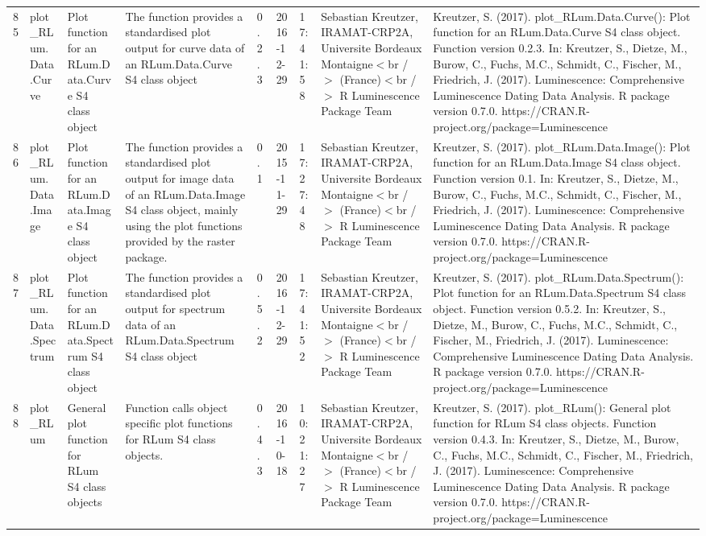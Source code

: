 \begin{table}[ht]
\begin{tabular}{rllllllll}
 \\ 
  85 & plot\_RLum.Data.Curve & Plot function for an RLum.Data.Curve S4 class object & The function provides a standardised plot output for curve data of an RLum.Data.Curve S4 class object & 0.2.3 & 2016-12-29 & 17:41:58
 & Sebastian Kreutzer, IRAMAT-CRP2A, Universite Bordeaux Montaigne$<$br /$>$ (France)$<$br /$>$  R Luminescence Package Team & Kreutzer, S. (2017). plot\_RLum.Data.Curve(): Plot function for an RLum.Data.Curve S4 class object. Function version 0.2.3. In: Kreutzer, S., Dietze, M., Burow, C., Fuchs, M.C., Schmidt, C., Fischer, M., Friedrich, J. (2017). Luminescence: Comprehensive Luminescence Dating Data Analysis. R package version 0.7.0. https://CRAN.R-project.org/package=Luminescence
 \\ 
  86 & plot\_RLum.Data.Image & Plot function for an  RLum.Data.Image  S4 class object & The function provides a standardised plot output for image data of an RLum.Data.Image S4 class object, mainly using the plot functions provided by the  raster  package. & 0.1 & 2015-11-29 & 17:27:48
 & Sebastian Kreutzer, IRAMAT-CRP2A, Universite Bordeaux Montaigne$<$br /$>$ (France)$<$br /$>$  R Luminescence Package Team & Kreutzer, S. (2017). plot\_RLum.Data.Image(): Plot function for an RLum.Data.Image S4 class object. Function version 0.1. In: Kreutzer, S., Dietze, M., Burow, C., Fuchs, M.C., Schmidt, C., Fischer, M., Friedrich, J. (2017). Luminescence: Comprehensive Luminescence Dating Data Analysis. R package version 0.7.0. https://CRAN.R-project.org/package=Luminescence
 \\ 
  87 & plot\_RLum.Data.Spectrum & Plot function for an RLum.Data.Spectrum S4 class object & The function provides a standardised plot output for spectrum data of an RLum.Data.Spectrum S4 class object & 0.5.2 & 2016-12-29 & 17:41:52
 & Sebastian Kreutzer, IRAMAT-CRP2A, Universite Bordeaux Montaigne$<$br /$>$ (France)$<$br /$>$  R Luminescence Package Team & Kreutzer, S. (2017). plot\_RLum.Data.Spectrum(): Plot function for an RLum.Data.Spectrum S4 class object. Function version 0.5.2. In: Kreutzer, S., Dietze, M., Burow, C., Fuchs, M.C., Schmidt, C., Fischer, M., Friedrich, J. (2017). Luminescence: Comprehensive Luminescence Dating Data Analysis. R package version 0.7.0. https://CRAN.R-project.org/package=Luminescence
 \\ 
  88 & plot\_RLum & General plot function for RLum S4 class objects & Function calls object specific plot functions for RLum S4 class objects. & 0.4.3 & 2016-10-18 & 10:21:27
 & Sebastian Kreutzer, IRAMAT-CRP2A, Universite Bordeaux Montaigne$<$br /$>$ (France)$<$br /$>$  R Luminescence Package Team & Kreutzer, S. (2017). plot\_RLum(): General plot function for RLum S4 class objects. Function version 0.4.3. In: Kreutzer, S., Dietze, M., Burow, C., Fuchs, M.C., Schmidt, C., Fischer, M., Friedrich, J. (2017). Luminescence: Comprehensive Luminescence Dating Data Analysis. R package version 0.7.0. https://CRAN.R-project.org/package=Luminescence

\end{tabular}
\end{table}
